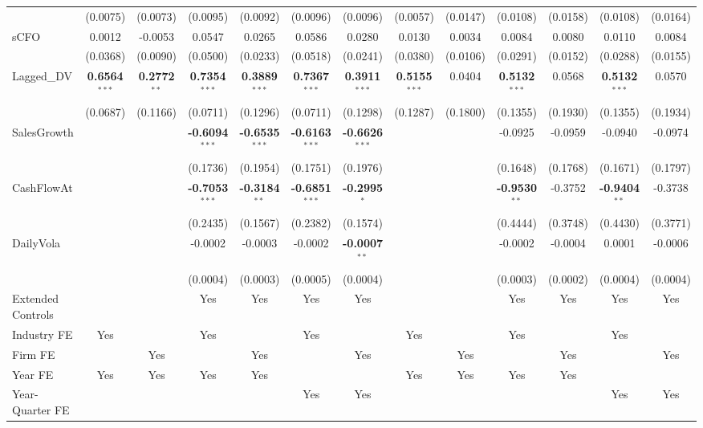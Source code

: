\documentclass[11pt,a4paper]{article}
\begin{document}
\begin{table}[htbp]
\begin{tabular}{lcccccccccccc}
 & (0.0075) & (0.0073) & (0.0095) & (0.0092) & (0.0096) & (0.0096) & (0.0057) & (0.0147) & (0.0108) & (0.0158) & (0.0108) & (0.0164) \\
sCFO & 0.0012 & -0.0053 & 0.0547 & 0.0265 & 0.0586 & 0.0280 & 0.0130 & 0.0034 & 0.0084 & 0.0080 & 0.0110 & 0.0084 \\
 & (0.0368) & (0.0090) & (0.0500) & (0.0233) & (0.0518) & (0.0241) & (0.0380) & (0.0106) & (0.0291) & (0.0152) & (0.0288) & (0.0155) \\
Lagged\_DV & \textbf{0.6564}$^{***}$ & \textbf{0.2772}$^{**}$ & \textbf{0.7354}$^{***}$ & \textbf{0.3889}$^{***}$ & \textbf{0.7367}$^{***}$ & \textbf{0.3911}$^{***}$ & \textbf{0.5155}$^{***}$ & 0.0404 & \textbf{0.5132}$^{***}$ & 0.0568 & \textbf{0.5132}$^{***}$ & 0.0570 \\
 & (0.0687) & (0.1166) & (0.0711) & (0.1296) & (0.0711) & (0.1298) & (0.1287) & (0.1800) & (0.1355) & (0.1930) & (0.1355) & (0.1934) \\
SalesGrowth &  &  & \textbf{-0.6094}$^{***}$ & \textbf{-0.6535}$^{***}$ & \textbf{-0.6163}$^{***}$ & \textbf{-0.6626}$^{***}$ &  &  & -0.0925 & -0.0959 & -0.0940 & -0.0974 \\
 &  &  & (0.1736) & (0.1954) & (0.1751) & (0.1976) &  &  & (0.1648) & (0.1768) & (0.1671) & (0.1797) \\
CashFlowAt &  &  & \textbf{-0.7053}$^{***}$ & \textbf{-0.3184}$^{**}$ & \textbf{-0.6851}$^{***}$ & \textbf{-0.2995}$^{*}$ &  &  & \textbf{-0.9530}$^{**}$ & -0.3752 & \textbf{-0.9404}$^{**}$ & -0.3738 \\
 &  &  & (0.2435) & (0.1567) & (0.2382) & (0.1574) &  &  & (0.4444) & (0.3748) & (0.4430) & (0.3771) \\
DailyVola &  &  & -0.0002 & -0.0003 & -0.0002 & \textbf{-0.0007}$^{**}$ &  &  & -0.0002 & -0.0004 & 0.0001 & -0.0006 \\
 &  &  & (0.0004) & (0.0003) & (0.0005) & (0.0004) &  &  & (0.0003) & (0.0002) & (0.0004) & (0.0004) \\
\midrule
Extended Controls &  &  & Yes & Yes & Yes & Yes &  &  & Yes & Yes & Yes & Yes \\
Industry FE & Yes &  & Yes &  & Yes &  & Yes &  & Yes &  & Yes &  \\
Firm FE &  & Yes &  & Yes &  & Yes &  & Yes &  & Yes &  & Yes \\
Year FE & Yes & Yes & Yes & Yes &  &  & Yes & Yes & Yes & Yes &  &  \\
Year-Quarter FE &  &  &  &  & Yes & Yes &  &  &  &  & Yes & Yes \\

\end{tabular}
\end{table}
\end{document}
